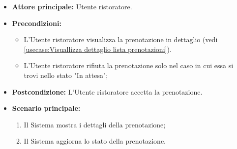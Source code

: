\label{usecase:Accetta prenotazione}
\begin{itemize}
	\item \textbf{Attore principale:} Utente ristoratore.

	\item \textbf{Precondizioni:} 
	\begin{itemize}
		\item L'Utente ristoratore visualizza la prenotazione in dettaglio (vedi \autoref{usecase:Visuallizza dettaglio lista prenotazioni}).
		\item L'Utente ristoratore rifiuta la prenotazione solo nel caso in cui essa si trovi nello stato "In attesa";
	\end{itemize}

	\item \textbf{Postcondizione:} L'Utente ristoratore accetta la prenotazione.


	\item \textbf{Scenario principale:}
	      \begin{enumerate}
		      \item Il Sistema mostra i dettagli della prenotazione;
		      \item Il Sistema aggiorna lo stato della prenotazione.

	      \end{enumerate}
\end{itemize}
